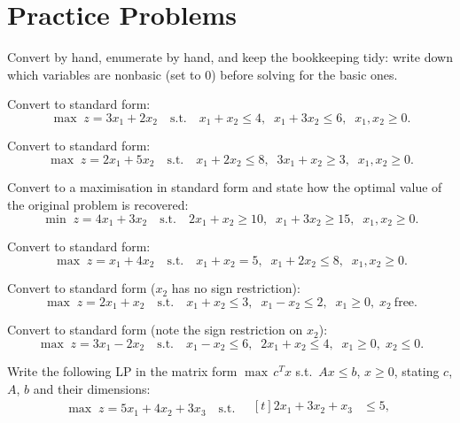 \section{Practice Problems}

Convert by hand, enumerate by hand, and keep the bookkeeping tidy: write
down which variables are nonbasic (set to $0$) before solving for the
basic ones.

\begin{problems}
  \item Convert to standard form:
        \[
          \max\; z=3x_{1}+2x_{2}
          \quad\text{s.t.}\quad
          x_{1}+x_{2}\le 4,\;\;
          x_{1}+3x_{2}\le 6,\;\;
          x_{1},x_{2}\ge 0 .
        \]
  \item Convert to standard form:
        \[
          \max\; z=2x_{1}+5x_{2}
          \quad\text{s.t.}\quad
          x_{1}+2x_{2}\le 8,\;\;
          3x_{1}+x_{2}\ge 3,\;\;
          x_{1},x_{2}\ge 0 .
        \]
  \item Convert to a maximisation in standard form and state how the
        optimal value of the original problem is recovered:
        \[
          \min\; z=4x_{1}+3x_{2}
          \quad\text{s.t.}\quad
          2x_{1}+x_{2}\ge 10,\;\;
          x_{1}+3x_{2}\ge 15,\;\;
          x_{1},x_{2}\ge 0 .
        \]
  \item Convert to standard form:
        \[
          \max\; z=x_{1}+4x_{2}
          \quad\text{s.t.}\quad
          x_{1}+x_{2}=5,\;\;
          x_{1}+2x_{2}\le 8,\;\;
          x_{1},x_{2}\ge 0 .
        \]
  \item Convert to standard form ($x_{2}$ has no sign restriction):
        \[
          \max\; z=2x_{1}+x_{2}
          \quad\text{s.t.}\quad
          x_{1}+x_{2}\le 3,\;\;
          x_{1}-x_{2}\le 2,\;\;
          x_{1}\ge 0,\; x_{2}\ \text{free}.
        \]
  \item Convert to standard form (note the sign restriction on $x_{2}$):
        \[
          \max\; z=3x_{1}-2x_{2}
          \quad\text{s.t.}\quad
          x_{1}-x_{2}\le 6,\;\;
          2x_{1}+x_{2}\le 4,\;\;
          x_{1}\ge 0,\; x_{2}\le 0 .
        \]
  \item Write the following LP in the matrix form $\max\,c^{T}x$ s.t.\
        $Ax\le b$, $x\ge 0$, stating $c$, $A$, $b$ and their dimensions:
        \[
          \max\; z=5x_{1}+4x_{2}+3x_{3}
          \quad\text{s.t.}\quad
          \begin{aligned}[t]
            2x_{1}+3x_{2}+x_{3}&\le 5,\\

\end{aligned}\]
\end{problems}
